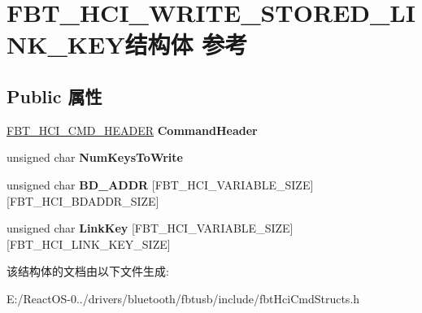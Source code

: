 \hypertarget{struct_f_b_t___h_c_i___w_r_i_t_e___s_t_o_r_e_d___l_i_n_k___k_e_y}{}\section{F\+B\+T\+\_\+\+H\+C\+I\+\_\+\+W\+R\+I\+T\+E\+\_\+\+S\+T\+O\+R\+E\+D\+\_\+\+L\+I\+N\+K\+\_\+\+K\+E\+Y结构体 参考}
\label{struct_f_b_t___h_c_i___w_r_i_t_e___s_t_o_r_e_d___l_i_n_k___k_e_y}
\subsection*{Public 属性}
\begin{DoxyCompactItemize}
\item 
\mbox{\label{struct_f_b_t___h_c_i___w_r_i_t_e___s_t_o_r_e_d___l_i_n_k___k_e_y_a087fe435cd6addd4e9c3ddea41829bed}} 
\hyperlink{struct_f_b_t___h_c_i___c_m_d___h_e_a_d_e_r}{F\+B\+T\+\_\+\+H\+C\+I\+\_\+\+C\+M\+D\+\_\+\+H\+E\+A\+D\+ER} {\bfseries Command\+Header}
\item 
\mbox{\label{struct_f_b_t___h_c_i___w_r_i_t_e___s_t_o_r_e_d___l_i_n_k___k_e_y_a5e964e10f534e1b4f05cd84ba0317e82}} 
unsigned char {\bfseries Num\+Keys\+To\+Write}
\item 
\mbox{\label{struct_f_b_t___h_c_i___w_r_i_t_e___s_t_o_r_e_d___l_i_n_k___k_e_y_a4bd3da1d19aad3ec8cbaa861a2e6be6b}} 
unsigned char {\bfseries B\+D\+\_\+\+A\+D\+DR} \mbox{[}F\+B\+T\+\_\+\+H\+C\+I\+\_\+\+V\+A\+R\+I\+A\+B\+L\+E\+\_\+\+S\+I\+ZE\mbox{]}\mbox{[}F\+B\+T\+\_\+\+H\+C\+I\+\_\+\+B\+D\+A\+D\+D\+R\+\_\+\+S\+I\+ZE\mbox{]}
\item 
\mbox{\label{struct_f_b_t___h_c_i___w_r_i_t_e___s_t_o_r_e_d___l_i_n_k___k_e_y_a6a8ea9a7822e87274573da2c39d16396}} 
unsigned char {\bfseries Link\+Key} \mbox{[}F\+B\+T\+\_\+\+H\+C\+I\+\_\+\+V\+A\+R\+I\+A\+B\+L\+E\+\_\+\+S\+I\+ZE\mbox{]}\mbox{[}F\+B\+T\+\_\+\+H\+C\+I\+\_\+\+L\+I\+N\+K\+\_\+\+K\+E\+Y\+\_\+\+S\+I\+ZE\mbox{]}
\end{DoxyCompactItemize}


该结构体的文档由以下文件生成\+:\begin{DoxyCompactItemize}
\item 
E\+:/\+React\+O\+S-\/0../drivers/bluetooth/fbtusb/include/fbt\+Hci\+Cmd\+Structs.\+h\end{DoxyCompactItemize}
